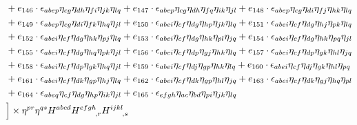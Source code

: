\begin{itemize}
{\begin{minipage}[t]{\linewidth}
\begin{align}
    & + e_{146} \cdot \epsilon_{a b e p} \eta_{c g} \eta_{d h} \eta_{f i} \eta_{j k} \eta_{l q} + e_{147} \cdot \epsilon_{a b e p} \eta_{c g} \eta_{d h} \eta_{f q} \eta_{i k} \eta_{j l} + e_{148} \cdot \epsilon_{a b e p} \eta_{c g} \eta_{d i} \eta_{f j} \eta_{h k} \eta_{l q} \nonumber \\
    & + e_{149} \cdot \epsilon_{a b e p} \eta_{c g} \eta_{d i} \eta_{f k} \eta_{h q} \eta_{j l} + e_{150} \cdot \epsilon_{a b e i} \eta_{c f} \eta_{d g} \eta_{h p} \eta_{j k} \eta_{l q} + e_{151} \cdot \epsilon_{a b e i} \eta_{c f} \eta_{d g} \eta_{h j} \eta_{p k} \eta_{l q} \nonumber \\
    & + e_{152} \cdot \epsilon_{a b e i} \eta_{c f} \eta_{d g} \eta_{h k} \eta_{p j} \eta_{l q} + e_{153} \cdot \epsilon_{a b e i} \eta_{c f} \eta_{d g} \eta_{h k} \eta_{p l} \eta_{j q} + e_{154} \cdot \epsilon_{a b e i} \eta_{c f} \eta_{d g} \eta_{h k} \eta_{p q} \eta_{j l} \nonumber \\
    & + e_{155} \cdot \epsilon_{a b e i} \eta_{c f} \eta_{d g} \eta_{h q} \eta_{p k} \eta_{j l} + e_{156} \cdot \epsilon_{a b e i} \eta_{c f} \eta_{d p} \eta_{g j} \eta_{h k} \eta_{l q} + e_{157} \cdot \epsilon_{a b e i} \eta_{c f} \eta_{d p} \eta_{g k} \eta_{h l} \eta_{j q} \nonumber \\
    & + e_{158} \cdot \epsilon_{a b e i} \eta_{c f} \eta_{d p} \eta_{g k} \eta_{h q} \eta_{j l} + e_{159} \cdot \epsilon_{a b e i} \eta_{c f} \eta_{d j} \eta_{g p} \eta_{h k} \eta_{l q} + e_{160} \cdot \epsilon_{a b e i} \eta_{c f} \eta_{d j} \eta_{g k} \eta_{h l} \eta_{p q} \nonumber \\
    & + e_{161} \cdot \epsilon_{a b e i} \eta_{c f} \eta_{d k} \eta_{g p} \eta_{h j} \eta_{l q} + e_{162} \cdot \epsilon_{a b e i} \eta_{c f} \eta_{d k} \eta_{g p} \eta_{h l} \eta_{j q} + e_{163} \cdot \epsilon_{a b e i} \eta_{c f} \eta_{d k} \eta_{g j} \eta_{h q} \eta_{p l} \nonumber \\
    & + e_{164} \cdot \epsilon_{a b e q} \eta_{c f} \eta_{d g} \eta_{h p} \eta_{i k} \eta_{j l} + e_{165} \cdot \epsilon_{e f g h} \eta_{a c} \eta_{b d} \eta_{p i} \eta_{j k} \eta_{l q} \nonumber \\
    & \Big\rbrack \times \eta^{pr} \eta^{qs} H^{abcd} H^{efgh}_{\hphantom{efgh},r} H^{ijkl}_{\hphantom{ijkl},s}
\end{align}
\end{minipage}} \\
  \scalebox{0.8}{%
    \begin{minipage}[t]{\linewidth}
\begin{align}\label{ansatz_ABCI}

\end{align}
\end{minipage}}
\end{itemize}

